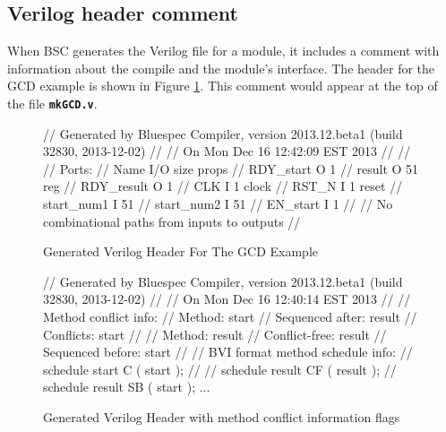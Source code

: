 \documentclass{article}
\newenvironment{centerboxverbatim}
  {\center
   \boxedverbatim}
  {\endboxedverbatim
  {\endcenter }}
\begin{document}



\subsection{Verilog header comment}

When BSC generates the Verilog file for a module,
it includes a comment with information about the compile and the
module's interface.  The header for the GCD example is shown in
Figure \ref{gcd_v_hdr-fig}.  This comment would appear at the top
of the file {\bf\tt mkGCD.v}.

\begin{figure}
\begin{centerboxverbatim}
// Generated by Bluespec Compiler, version 2013.12.beta1 (build 32830, 2013-12-02)
//
// On Mon Dec 16 12:42:09 EST 2013
//
//
// Ports:
// Name                         I/O  size props
// RDY_start                      O     1
// result                         O    51 reg
// RDY_result                     O     1
// CLK                            I     1 clock
// RST_N                          I     1 reset
// start_num1                     I    51
// start_num2                     I    51
// EN_start                       I     1
//
// No combinational paths from inputs to outputs
//
\end{centerboxverbatim}
  \caption{\label{gcd_v_hdr-fig}Generated Verilog Header For The GCD Example}
\end{figure}


\begin{figure}
\begin{centerboxverbatim}
// Generated by Bluespec Compiler, version 2013.12.beta1 (build 32830, 2013-12-02)
//
// On Mon Dec 16 12:40:14 EST 2013
//
// Method conflict info:
// Method: start
// Sequenced after: result
// Conflicts: start
//
// Method: result
// Conflict-free: result
// Sequenced before: start
//
// BVI format method schedule info:
// schedule start  C ( start );
//
// schedule result  CF ( result );
// schedule result  SB ( start );
...
\end{centerboxverbatim}
  \caption{\label{gcd_v_hdr-fig2}Generated Verilog Header with method
  conflict information flags}
\end{figure}
\end{document}
